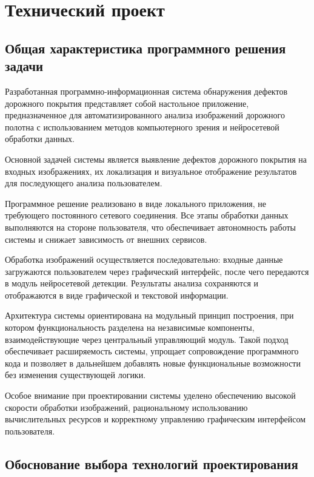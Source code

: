\section{Технический проект}

\subsection{Общая характеристика программного решения задачи}

Разработанная программно-информационная система обнаружения дефектов дорожного покрытия представляет собой настольное приложение, предназначенное для автоматизированного анализа изображений дорожного полотна с использованием методов компьютерного зрения и нейросетевой обработки данных.

Основной задачей системы является выявление дефектов дорожного покрытия на входных изображениях, их локализация и визуальное отображение результатов для последующего анализа пользователем.

Программное решение реализовано в виде локального приложения, не требующего постоянного сетевого соединения. Все этапы обработки данных выполняются на стороне пользователя, что обеспечивает автономность работы системы и снижает зависимость от внешних сервисов.

Обработка изображений осуществляется последовательно: входные данные загружаются пользователем через графический интерфейс, после чего передаются в модуль нейросетевой детекции. Результаты анализа сохраняются и отображаются в виде графической и текстовой информации.

Архитектура системы ориентирована на модульный принцип построения, при котором функциональность разделена на независимые компоненты, взаимодействующие через центральный управляющий модуль. Такой подход обеспечивает расширяемость системы, упрощает сопровождение программного кода и позволяет в дальнейшем добавлять новые функциональные возможности без изменения существующей логики.

Особое внимание при проектировании системы уделено обеспечению высокой скорости обработки изображений, рациональному использованию вычислительных ресурсов и корректному управлению графическим интерфейсом пользователя.

\subsection{Обоснование выбора технологий проектирования}


